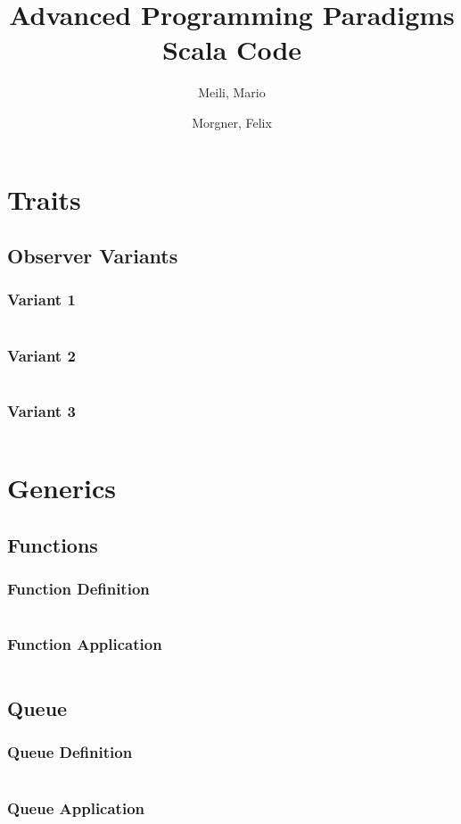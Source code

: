 \documentclass[a4paper,9pt,twoside]{book}
\title{%
Advanced Programming Paradigms\\
\normalsize{Scala Code}
}
\author{%
  Meili, Mario\\
  \and
  Morgner, Felix
}
\newcommand{\scalafile}[1]{\inputminted[breaklines]{scala}{../scala/#1.scala}}
\begin{document}
\maketitle{}
\tableofcontents{}

\chapter{Traits}
\section{Observer Variants}
\subsection{Variant 1}
\scalafile{traits/ObserverTest1}
\subsection{Variant 2}
\scalafile{traits/ObserverTest2}
\subsection{Variant 3}
\scalafile{traits/ObserverTest3}

\chapter{Generics}
\section{Functions}
\subsection{Function Definition}
\scalafile{generics/Function1}
\subsection{Function Application}
\scalafile{generics/Main}
\section{Queue}
\subsection{Queue Definition}
\scalafile{generics/Queue}
\subsection{Queue Application}
\scalafile{generics/QueueTest}
\end{document}
